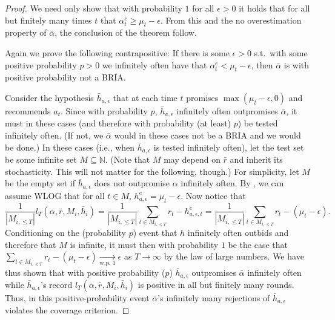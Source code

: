 \documentclass[submission,copyright,creativecommons]{eptcs}
\begin{document}
\begin{proof}
We need only show that with probability $1$ for all $\epsilon>0$ it holds that for all but finitely many times $t$ that $\alpha_t^e\geq \mu_t-\epsilon$. From this and the no overestimation property of $\bar \alpha$, the conclusion of the theorem follow.

Again we prove the following contrapositive: If there is some $\epsilon>0$ s.t.\ with some positive probability $p>0$ we infinitely often have that $\alpha_t^e< \mu_t-\epsilon$, then $\bar\alpha$ is with positive probability not a BRIA.

Consider the hypothesis $\bar h_{a,\epsilon}$ that at each time $t$ promises $\max(\mu_t-\epsilon,0)$ and recommends $a_t$. Since with probability $p$, $\bar h_{a,\epsilon}$ infinitely often outpromises $\bar \alpha$, it must in these cases (and therefore with probability (at least) $p$) be tested infinitely often. (If not, we $\bar\alpha$ would in these cases not be a BRIA and we would be done.) In these cases (i.e., when $\bar h_{a,\epsilon}$ is tested infinitely often), let the test set be some infinite set $M\subseteq \mathbb{N}$. (Note that $M$ may depend on $\bar r$ and inherit its stochasticity. This will not matter for the following, though.) For simplicity, let $M$ be the empty set if $\bar h_{a,\epsilon}$ does not outpromise $\alpha$ infinitely often. By , we can assume WLOG that for all $t\in M$, $h_{a,\epsilon}^e=\mu_t-\epsilon$. Now notice that
\begin{equation*}
\frac{1}{|M_{i,\leq T}|} l_T(\alpha,\bar r,M_i,\bar h_i)= \frac{1}{|M_{i,\leq T}|}\sum_{t\in M_{i,\leq T}} r_t-h_{a,\epsilon,t}^e = \frac{1}{|M_{i,\leq T}|} \sum_{t\in M_{i,\leq T}} r_t-(\mu_t-\epsilon).
\end{equation*}
Conditioning on the (probability $p$) event that $h$ infinitely often outbids and therefore that $M$ is infinite, it must then with probability $1$ be the case that $\sum_{t\in M_{i,\leq T}} r_t-(\mu_t-\epsilon) \underset{\text{w.p. }1}{\rightarrow} \epsilon$ as $T\rightarrow \infty$ by the law of large numbers. We have thus shown that with positive probability ($p$) $\bar h_{a,\epsilon}$ outpromises $\bar \alpha$ infinitely often while $\bar h_{a,\epsilon}$'s record  $l_T(\alpha,\bar r,M_i,\bar h_i)$ is positive in all but finitely many rounds. Thus, in this positive-probability event $\bar\alpha$'s infinitely many rejections of $\bar h_{a,\epsilon}$ violates the coverage criterion.
\end{proof}
\end{document}
